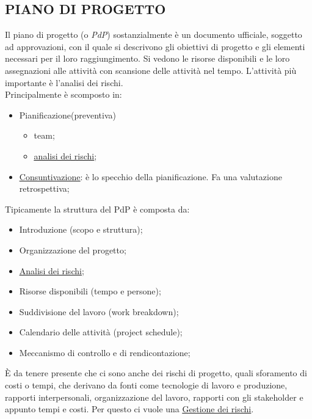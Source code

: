 		\subsection{PIANO DI PROGETTO}  \label{piano}
		Il piano di progetto (o \textit{PdP}) sostanzialmente è un documento ufficiale, soggetto ad approvazioni, con il quale si descrivono gli obiettivi di progetto e gli elementi necessari per il loro raggiungimento. Si vedono le risorse disponibili e le loro assegnazioni alle attività con scansione delle attività nel tempo. L'attività più importante è l'analisi dei rischi. \\
		Principalmente è scomposto in:
			\begin{itemize}
				\item Pianificazione(preventiva)
					\begin{itemize}
						\item team;
						\item \underline{\hyperref[analisirischi]{analisi dei rischi}};
					\end{itemize}
				\item \underline{\hyperref[consuntivo]{Consuntivazione}}: è lo specchio della pianificazione. Fa una valutazione retrospettiva;
			\end{itemize}
		Tipicamente la struttura del PdP è composta da:
			\begin{itemize}
				\item Introduzione (scopo e struttura);
				\item Organizzazione del progetto;
				\item \underline{\hyperref[analisirischi]{Analisi dei rischi}};
				\item Risorse disponibili (tempo e persone);
				\item Suddivisione del lavoro (work breakdown);
				\item Calendario delle attività (project schedule);
				\item Meccanismo di controllo e di rendicontazione;
			\end{itemize}
		È da tenere presente che ci sono anche dei rischi di progetto, quali sforamento di costi o tempi, che derivano da fonti come tecnologie di lavoro e produzione, rapporti interpersonali, organizzazione del lavoro, rapporti con gli stakeholder e appunto tempi e costi. Per questo ci vuole una \underline{\hyperref[gestionerischi]{Gestione dei rischi}}. 
		
		

